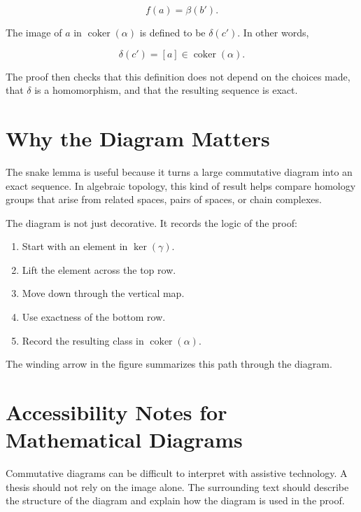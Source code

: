 \begin{equation}
f(a)=\beta(b').
\label{eq:choose-a}
\end{equation}

The image of \(a\) in \(\operatorname{coker}(\alpha)\) is defined to be \(\delta(c')\). In other words,

\begin{equation}
\delta(c')=[a]\in \operatorname{coker}(\alpha).
\label{eq:delta-definition}
\end{equation}

The proof then checks that this definition does not depend on the choices made, that \(\delta\) is a homomorphism, and that the resulting sequence is exact.

\section{Why the Diagram Matters}
\label{sec:why-diagram-matters}

The snake lemma is useful because it turns a large commutative diagram into an exact sequence. In algebraic topology, this kind of result helps compare homology groups that arise from related spaces, pairs of spaces, or chain complexes.

The diagram is not just decorative. It records the logic of the proof:

\begin{enumerate}
  \item Start with an element in \(\ker(\gamma)\).
  \item Lift the element across the top row.
  \item Move down through the vertical map.
  \item Use exactness of the bottom row.
  \item Record the resulting class in \(\operatorname{coker}(\alpha)\).
\end{enumerate}

The winding arrow in the figure summarizes this path through the diagram.

\section{Accessibility Notes for Mathematical Diagrams}
\label{sec:math-diagram-accessibility}

Commutative diagrams can be difficult to interpret with assistive technology. A thesis should not rely on the image alone. The surrounding text should describe the structure of the diagram and explain how the diagram is used in the proof.


